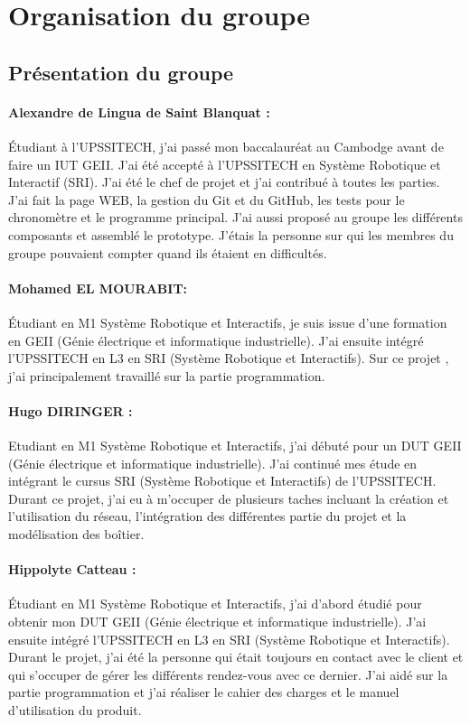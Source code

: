 \section{Organisation du groupe}
\subsection{Présentation du groupe}
\paragraph{Alexandre de Lingua de Saint Blanquat :}
Étudiant à l'UPSSITECH, j'ai passé mon baccalauréat au Cambodge avant de faire un IUT GEII. J'ai été accepté à l'UPSSITECH en Système Robotique et Interactif (SRI). J'ai été le chef de projet et j'ai contribué à toutes les parties. J'ai fait la page WEB, la gestion du Git et du GitHub, les tests pour le chronomètre et le programme principal. J'ai aussi proposé au groupe les différents composants et assemblé le prototype. J'étais la personne sur qui les membres du groupe pouvaient compter quand ils étaient en difficultés.

\paragraph{Mohamed EL MOURABIT:}
Étudiant en M1 Système Robotique et Interactifs, je suis issue d'une formation en GEII (Génie électrique et informatique industrielle). J’ai ensuite intégré l’UPSSITECH en L3 en SRI (Système Robotique et Interactifs). Sur ce projet , j'ai principalement travaillé sur la partie programmation. 

\paragraph{Hugo DIRINGER :}
Etudiant en M1 Système Robotique et Interactifs, j’ai débuté pour un DUT GEII (Génie électrique et informatique industrielle). J’ai continué mes étude en intégrant le cursus SRI (Système Robotique et Interactifs) de l’UPSSITECH. Durant ce projet, j’ai eu à m'occuper de plusieurs taches incluant la création et l'utilisation du réseau, l'intégration des différentes partie du projet et la modélisation des boîtier.

\paragraph{Hippolyte Catteau :}
Étudiant en M1 Système Robotique et Interactifs, j'ai d'abord étudié pour obtenir mon DUT GEII (Génie électrique et informatique industrielle). J’ai ensuite intégré l’UPSSITECH en L3 en SRI (Système Robotique et Interactifs). Durant le projet, j'ai été la personne qui était toujours en contact avec le client et qui s'occuper de gérer les différents rendez-vous avec ce dernier. J'ai aidé sur la partie programmation et j'ai réaliser le cahier des charges et le manuel d'utilisation du produit.

